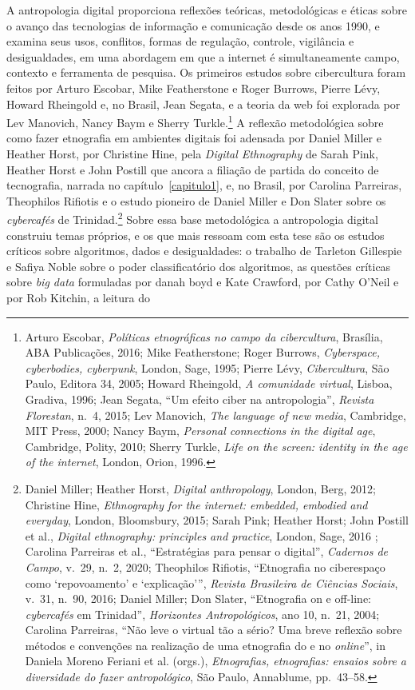 A antropologia digital proporciona reflexões teóricas, metodológicas e éticas sobre o avanço das tecnologias de informação e comunicação desde os anos 1990, e examina seus usos, conflitos, formas de regulação, controle, vigilância e desigualdades, em uma abordagem em que a internet é simultaneamente campo, contexto e ferramenta de pesquisa. Os primeiros estudos sobre cibercultura foram feitos por Arturo Escobar, Mike Featherstone e Roger Burrows, Pierre Lévy, Howard Rheingold e, no Brasil, Jean Segata, e a teoria da web foi explorada por Lev Manovich, Nancy Baym e Sherry Turkle.\footnote{Arturo Escobar, \textit{Políticas etnográficas no campo da cibercultura}, Brasília, ABA Publicações, 2016; Mike Featherstone; Roger Burrows, \textit{Cyberspace, cyberbodies, cyberpunk}, London, Sage, 1995; Pierre Lévy, \textit{Cibercultura}, São Paulo, Editora 34, 2005; Howard Rheingold, \textit{A comunidade virtual}, Lisboa, Gradiva, 1996; Jean Segata, \enquote{Um efeito ciber na antropologia}, \textit{Revista Florestan}, n.~4, 2015; Lev Manovich, \textit{The language of new media}, Cambridge, MIT Press, 2000; Nancy Baym, \textit{Personal connections in the digital age}, Cambridge, Polity, 2010; Sherry Turkle, \textit{Life on the screen: identity in the age of the internet}, London, Orion, 1996.} A reflexão metodológica sobre como fazer etnografia em ambientes digitais foi adensada por Daniel Miller e Heather Horst, por Christine Hine, pela \textit{Digital Ethnography} de Sarah Pink, Heather Horst e John Postill que ancora a filiação de partida do conceito de tecnografia, narrada no capítulo~\ref{capitulo1}, e, no Brasil, por Carolina Parreiras, Theophilos Rifiotis e o estudo pioneiro de Daniel Miller e Don Slater sobre os \textit{cybercafés} de Trinidad.\footnote{Daniel Miller; Heather Horst, \textit{Digital anthropology}, London, Berg, 2012; Christine Hine, \textit{Ethnography for the internet: embedded, embodied and everyday}, London, Bloomsbury, 2015; Sarah Pink; Heather Horst; John Postill et al., \textit{Digital ethnography: principles and practice}, London, Sage, 2016 \parencite{Pink2016DigitalEthnography}; Carolina Parreiras et al., \enquote{Estratégias para pensar o digital}, \textit{Cadernos de Campo}, v.~29, n.~2, 2020; Theophilos Rifiotis, \enquote{Etnografia no ciberespaço como \enquote{repovoamento} e \enquote{explicação}}, \textit{Revista Brasileira de Ciências Sociais}, v.~31, n.~90, 2016; Daniel Miller; Don Slater, \enquote{Etnografia on e off-line: \textit{cybercafés} em Trinidad}, \textit{Horizontes Antropológicos}, ano 10, n.~21, 2004; Carolina Parreiras, \enquote{Não leve o virtual tão a sério? Uma breve reflexão sobre métodos e convenções na realização de uma etnografia do e no \textit{online}}, in Daniela Moreno Feriani et al. (orgs.), \textit{Etnografias, etnografias: ensaios sobre a diversidade do fazer antropológico}, São Paulo, Annablume, pp.~43--58.} Sobre essa base metodológica a antropologia digital construiu temas próprios, e os que mais ressoam com esta tese são os estudos críticos sobre algoritmos, dados e desigualdades: o trabalho de Tarleton Gillespie e Safiya Noble sobre o poder classificatório dos algoritmos, as questões críticas sobre \textit{big data} formuladas por danah boyd e Kate Crawford, por Cathy O'Neil e por Rob Kitchin, a leitura do 
